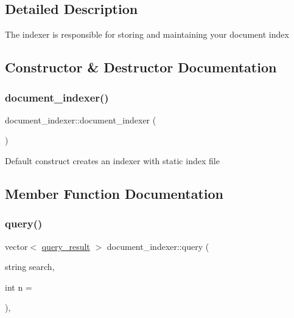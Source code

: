 \subsection{Detailed Description}
The indexer is responsible for storing and maintaining your document index 

\subsection{Constructor \& Destructor Documentation}
\mbox{\label{classdocument__indexer_a569b5a1dc381efce6ab2ab64644a7662}} 
\subsubsection{\texorpdfstring{document\+\_\+indexer()}{document\_indexer()}}
{\footnotesize\ttfamily document\+\_\+indexer\+::document\+\_\+indexer (\begin{DoxyParamCaption}{ }\end{DoxyParamCaption})}

Default construct creates an indexer with static index file 

\subsection{Member Function Documentation}
\mbox{\label{classdocument__indexer_acdb8dcbe7827e775ab8d64e79212ea36}} 
\subsubsection{\texorpdfstring{query()}{query()}}
{\footnotesize\ttfamily vector$<$ \hyperlink{classquery__result}{query\+\_\+result} $>$ document\+\_\+indexer\+::query (\begin{DoxyParamCaption}\item[{string}]{search,  }\item[{int}]{n = {} }\end{DoxyParamCaption})\hspace{0.3cm}{\ttfamily [override]}, {\ttfamily [virtual]}}

